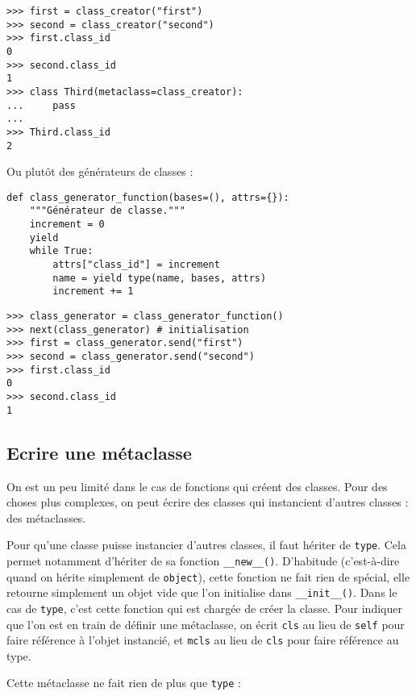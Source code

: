 \begin{verbatim}
>>> first = class_creator("first")
>>> second = class_creator("second")
>>> first.class_id
0
>>> second.class_id
1
>>> class Third(metaclass=class_creator):
...     pass
...
>>> Third.class_id
2
\end{verbatim}

Ou plutôt des générateurs de classes :

\begin{verbatim}
def class_generator_function(bases=(), attrs={}):
    """Générateur de classe."""
    increment = 0
    yield
    while True:
        attrs["class_id"] = increment
        name = yield type(name, bases, attrs)
        increment += 1
\end{verbatim}

\begin{verbatim}
>>> class_generator = class_generator_function()
>>> next(class_generator) # initialisation
>>> first = class_generator.send("first")
>>> second = class_generator.send("second")
>>> first.class_id
0
>>> second.class_id
1
\end{verbatim}

\subsection{Ecrire une métaclasse}

On est un peu limité dans le cas de fonctions qui créent des classes. Pour des choses plus complexes, on peut écrire
des classes qui instancient d'autres classes : des métaclasses.\medskip

Pour qu'une classe puisse instancier d'autres classes, il faut hériter de \texttt{type}. Cela permet notamment d'hériter de sa fonction \texttt{__new__()}. D'habitude (c'est-à-dire quand on hérite simplement de \texttt{object}), cette fonction ne fait rien de spécial, elle retourne simplement un objet vide que l'on initialise dans \texttt{__init__()}. Dans le cas de \texttt{type}, c'est cette fonction qui est chargée de créer la classe. Pour indiquer que l'on est en train de définir une métaclasse, on écrit \texttt{cls} au lieu de \texttt{self} pour faire référence à l'objet instancié, et \texttt{mcls} au lieu de \texttt{cls} pour faire référence au type.\medskip

Cette métaclasse ne fait rien de plus que \texttt{type} :

